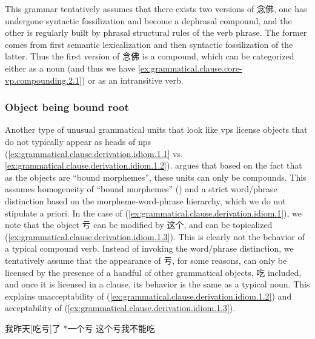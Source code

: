 \documentclass[UTF8, a4paper, oneside, scheme=plain, 12pt]{ctexrep}
\newcommand*{\citepage}[1]{p.~{#1}}
\begin{document}
This grammar tentatively assumes that there exists two versions of 念佛,
one has undergone syntactic fossilization and become a dephrasal compound, 
and the other is regularly built by phrasal structural rules of the verb phrase.
The former comes from first semantic lexicalization and then syntactic fossilization of the latter.
Thus the first version of 念佛 is a compound,
which can be categorized either as a noun (and thus we have \ref{ex:grammatical.clause.core-vp.compounding.2.1}) or as an intransitive verb.

\subsubsection{Object being bound root}\label{sec:grammatical.clause.core-vp.derivation.object-bound}

Another type of unusual grammatical units that look like \acp{vp} 
license objects that do not typically appear as heads of \acp{np}
(\ref{ex:grammatical.clause.derivation.idiom.1.1} vs. \ref{ex:grammatical.clause.derivation.idiom.1.2}).
\citet[\citepage{129}]{zhudexigrammar} argues that based on the fact that 
as the objects are ``bound morphemes'', these units can only be compounds.
This assumes homogeneity of ``bound morphemes'' ()
and a strict word/phrase distinction based on the morpheme-word-phrase hierarchy,
which we do not stipulate a priori.
In the case of (\ref{ex:grammatical.clause.derivation.idiom.1}),
we note that the object 亏 can be modified by 这个,
and can be topicalized (\ref{ex:grammatical.clause.derivation.idiom.1.3}).
This is clearly not the behavior of a typical compound verb.
Instead of invoking the word/phrase distinction,
we tentatively assume that the appearance of 亏,
for some reasons, can only be licensed by the presence of a handful of other grammatical objects,
吃 included, and once it is licensed in a clause,
its behavior is the same as a typical noun.
This explains unacceptability of (\ref{ex:grammatical.clause.derivation.idiom.1.2})
and acceptability of (\ref{ex:grammatical.clause.derivation.idiom.1.3}).

\begin{exe}
    \ex\label{ex:grammatical.clause.derivation.idiom.1} \begin{xlist}
        \ex\label{ex:grammatical.clause.derivation.idiom.1.1} 我昨天[吃亏]了
        \ex\label{ex:grammatical.clause.derivation.idiom.1.2} *一个亏
        \ex\label{ex:grammatical.clause.derivation.idiom.1.3} 这个亏我不能吃
    \end{xlist}
\end{exe}
\end{document}
